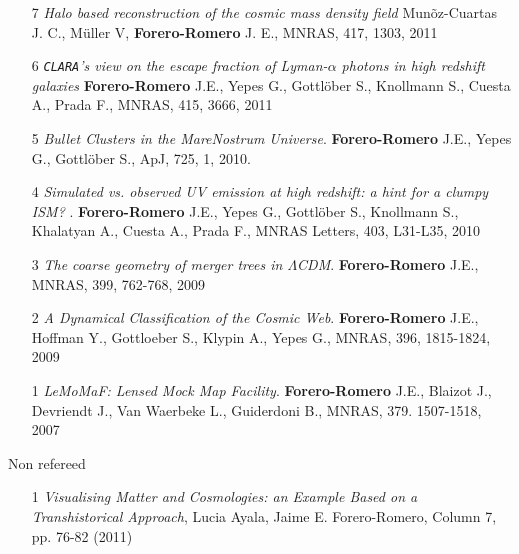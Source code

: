 \documentclass[letterpaper,11pt,onecolumn]{article}
\begin{document}
\begin{enumerate}
\item[7] 
{\it Halo based reconstruction of the cosmic mass density field}
Mun\~oz-Cuartas J. C., M\"uller V, {\bf Forero-Romero} J. E.,
MNRAS, 417, 1303, 2011 
 
\item [6]
{\it {\tt CLARA}'s view on the escape fraction of Lyman-$\alpha$ photons in
  high redshift galaxies}
{\bf Forero-Romero} J.E., Yepes G., Gottl\"ober S., Knollmann S., Cuesta A., Prada F.,  
MNRAS, 415, 3666, 2011

\item [5]
{\it Bullet Clusters in the MareNostrum Universe}. 
{\bf Forero-Romero} J.E., Yepes G., Gottl\"ober S., 
ApJ, 725, 1, 2010.

\item [4]
{\it Simulated vs. observed UV emission at high redshift: a hint for a clumpy
ISM? }. 
{\bf Forero-Romero} J.E., Yepes G., Gottl\"ober S., Knollmann S., Khalatyan A., Cuesta A., Prada F.,   MNRAS Letters, 403,  L31-L35, 2010

\item [3]
{\it The coarse geometry of merger trees in
  $\Lambda$CDM}.  {\bf Forero-Romero} J.E., 
MNRAS, 399, 762-768, 2009

\item [2]
{\it A Dynamical Classification of the  Cosmic Web}.  {\bf Forero-Romero} J.E., Hoffman Y.,  Gottloeber S., Klypin A., Yepes G.,
MNRAS, 396, 1815-1824, 2009

\item [1] 
{\it {\sc LeMoMaF}:  Lensed Mock Map Facility}. 
{\bf Forero-Romero} J.E., Blaizot J., Devriendt J., Van Waerbeke L., Guiderdoni B., 
MNRAS, 379. 1507-1518, 2007
\end{enumerate}




Non refereed 
\begin{enumerate}
\item[1] {\it Visualising Matter and Cosmologies: an Example Based on
  a Transhistorical Approach}, Lucia Ayala, Jaime E. Forero-Romero,
  Column 7, pp. 76-82 (2011) 
\end{enumerate}
\end{document}
